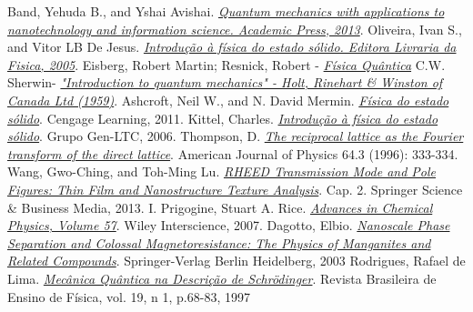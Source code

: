  Band, Yehuda B., and Yshai Avishai. \href{https://www.elsevier.com/books/quantum-mechanics-with-applications-to-nanotechnology-and-information-science/band/978-0-444-53786-7}\textit{Quantum mechanics with applications to nanotechnology and information science. Academic Press, 2013}.
 Oliveira, Ivan S., and Vitor LB De Jesus. \href{http://www.saraiva.com.br/introducao-a-fisica-do-estado-solido-2-ed-3527998.html}\textit{Introdução à física do estado sólido. Editora Livraria da Fisica, 2005}.
 Eisberg, Robert Martin; Resnick, Robert - \href{https://www.livrariadafisica.com.br/detalhe_produto.aspx?id=6237}\textit{Física Quântica}
 C.W. Sherwin- \href{https://www.amazon.com/Introduction-Quantum-Mechanics-C-W-Sherwin/dp/0030068851}\textit{"Introduction to quantum mechanics" - Holt, Rinehart \& Winston of Canada Ltd (1959)}. 
 Ashcroft, Neil W., and N. David Mermin. \href{https://www.livrariadafisica.com.br/detalhe_produto.aspx?id=101883}\textit{Física do estado sólido}. Cengage Learning, 2011.
 Kittel, Charles. \href{https://www.amazon.com.br/dp/8521615051/ref=asc_df_85216150515016109?smid=A1ZZFT5FULY4LN&tag=goog0ef-20&linkCode=asn&creative=380341&creativeASIN=8521615051}\textit{Introdução à física do estado sólido}. Grupo Gen-LTC, 2006.
 Thompson, D. \href{http://aapt.scitation.org/doi/abs/10.1119/1.18243}\textit{The reciprocal lattice as the Fourier transform of the direct lattice}. American Journal of Physics 64.3 (1996): 333-334.
 Wang, Gwo-Ching, and Toh-Ming Lu. \href{https://books.google.com.br/books?hl=pt-BR&lr=&id=LEC9BAAAQBAJ&oi=fnd&pg=PR6&dq=ISBN:+978-1-4614-9286-3&ots=6N688QVTZa&sig=eKxt-la7NjrX5ZWrmHEoIZpaTwQ#v=onepage&q=ISBN%3A%20978-1-4614-9286-3&f=false}\textit{RHEED Transmission Mode and Pole Figures: Thin Film and Nanostructure Texture Analysis}. Cap. 2. Springer Science \& Business Media, 2013.
 I. Prigogine, Stuart A. Rice. \href{http://onlinelibrary.wiley.com/book/10.1002/9780470142813}\textit{Advances in Chemical Physics, Volume 57}. Wiley Interscience, 2007.
 Dagotto, Elbio. \href{http://www.springer.com/la/book/9783540432456} \textit{Nanoscale Phase Separation and Colossal Magnetoresistance: The Physics of Manganites and Related Compounds}. Springer-Verlag Berlin Heidelberg, 2003 
 Rodrigues, Rafael de Lima. \href{http://sbfisica.org.br/rbef/pdf/v19_68.pdf}\textit{Mecânica Quântica na Descrição de Schrödinger}. Revista Brasileira de Ensino de Física, vol. 19, n 1, p.68-83, 1997

